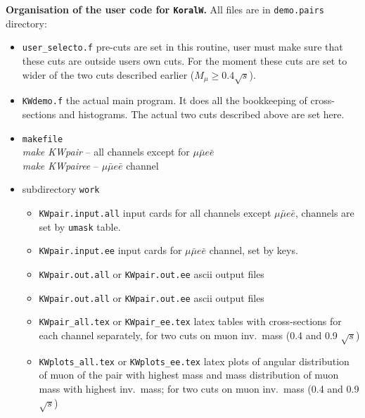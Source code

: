 \documentclass[dvips,portrait]{seminar}             %
\begin{document}
\begin{slide*}                                                %

{\scriptsize\color{blue}
{\bf Organisation of the user code for {\tt KoralW}.}
All files are in {\tt demo.pairs} directory:
\begin{itemize}
\item
{\tt user\_selecto.f} pre-cuts are set in this routine, user must make
sure that these cuts are outside users own cuts. For the moment these
cuts are set to wider of the two cuts described earlier ($M_\mu \geq
0.4\sqrt{s}$). 
\item
{\tt KWdemo.f} the actual main program. It does all the bookkeeping
of cross-sections and histograms. The actual two cuts described above are
set here.
\item
{\tt makefile}\\
    {\em make KWpair} -- all channels except for $\mu\bar\mu e\bar e$\\
    {\em make KWpairee} -- $\mu\bar\mu e\bar e$ channel
\item
subdirectory {\tt work}
\begin{itemize}
\item
 {\tt KWpair.input.all} input cards for all channels except $\mu\bar\mu
   e\bar e$, channels are set by {\tt umask} table.
\item
 {\tt KWpair.input.ee} input cards for $\mu\bar\mu e\bar e$ channel, 
   set by keys.
\item
 {\tt KWpair.out.all} or {\tt KWpair.out.ee} ascii output files
\item
 {\tt KWpair.out.all} or {\tt KWpair.out.ee} ascii output files
\item
 {\tt KWpair\_all.tex} or {\tt KWpair\_ee.tex} latex tables with
cross-sections for each channel separately, for two cuts on muon inv.\
mass (0.4 and 0.9 $\sqrt{s}$)
\item 
 {\tt KWplots\_all.tex} or {\tt KWplots\_ee.tex} latex plots of angular
distribution of muon of the pair with highest mass and mass distribution
of muon mass with highest inv.\ mass; for two cuts on muon inv.\
mass (0.4 and 0.9 $\sqrt{s}$)
\end{itemize}
\end{itemize}
}
\vfill
\end{slide*}   %
\end{document}

